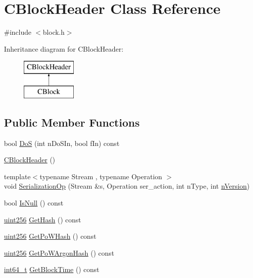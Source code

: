\hypertarget{class_c_block_header}{}\section{C\+Block\+Header Class Reference}
\label{class_c_block_header}


{\ttfamily \#include $<$block.\+h$>$}

Inheritance diagram for C\+Block\+Header\+:\begin{figure}[H]
\begin{center}
\leavevmode
\includegraphics[height=2.000000cm]{class_c_block_header}
\end{center}
\end{figure}
\subsection*{Public Member Functions}
\begin{DoxyCompactItemize}
\item 
bool \hyperlink{class_c_block_header_a514e4d5250fa700272ac467fecf7fa7b}{Do\+S} (int n\+Do\+S\+In, bool f\+In) const 
\item 
\hyperlink{class_c_block_header_a9afed57bea877bbd25b5eb6740c6990d}{C\+Block\+Header} ()
\item 
{\footnotesize template$<$typename Stream , typename Operation $>$ }\\void \hyperlink{class_c_block_header_ae564e96da45702d79c83e3ad0ce19873}{Serialization\+Op} (Stream \&s, Operation ser\+\_\+action, int n\+Type, int \hyperlink{class_c_block_header_ad64b7a76914741861f55f0f38ed66fb5}{n\+Version})
\item 
bool \hyperlink{class_c_block_header_a5c179f4a8b5728ba381a26d0450403b8}{Is\+Null} () const 
\item 
\hyperlink{classuint256}{uint256} \hyperlink{class_c_block_header_ae1165e54882d364b030fb33673d64dbd}{Get\+Hash} () const 
\item 
\hyperlink{classuint256}{uint256} \hyperlink{class_c_block_header_ace82f72f060caa4fd96759b4ff99a25e}{Get\+Po\+W\+Hash} () const 
\item 
\hyperlink{classuint256}{uint256} \hyperlink{class_c_block_header_a795e040a33329757f6b31dfbcabbb2a5}{Get\+Po\+W\+Argon\+Hash} () const 
\item 
\hyperlink{stdint_8h_adec1df1b8b51cb32b77e5b86fff46471}{int64\+\_\+t} \hyperlink{class_c_block_header_a2972ebc9d970b4b12434876263c4c2b5}{Get\+Block\+Time} () const 
\end{DoxyCompactItemize}
